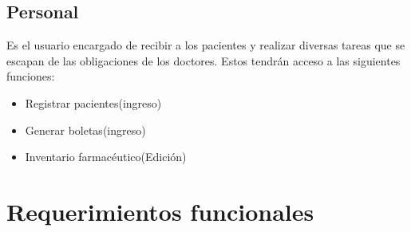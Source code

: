 \documentclass[10pt]{article}
\begin{document}
\subsection{Personal }
Es el usuario encargado de recibir a los pacientes y realizar diversas tareas que se escapan de las obligaciones de los doctores.
Estos tendrán acceso a las siguientes funciones:
\begin{itemize}
    \item Registrar pacientes(ingreso)
    \item Generar boletas(ingreso)
    \item Inventario farmacéutico(Edición)
\end{itemize}



\section{Requerimientos funcionales}
\end{document}
